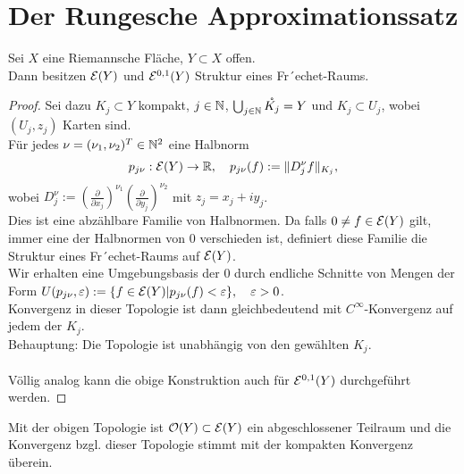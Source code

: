 
\section{Der Rungesche Approximationssatz}
\label{sec:Runge}


\begin{prop}
  Sei $X$ eine Riemannsche Fläche, $Y \subset X$ offen. \\
  Dann besitzen $\mathcal{E}(Y)$ und $\mathcal{E}^{0,1}(Y)$ Struktur eines Fr´echet-Raums.
\end{prop}

\begin{proof}
  Sei dazu $K_j \subset Y$ kompakt, $j \in \mathbb{N}$, $\bigcup_{j \in \mathbb{N}}
  \mathring{K_j} = Y$ und $K_j \subset U_j$, wobei $(U_j, z_j)$ Karten
  sind. \\
  Für jedes $\nu = (\nu_1, \nu_2)^T \in \mathbb{N}^2$ eine Halbnorm
  \[
  p_{j\nu}: \mathcal{E}(Y) \rightarrow \mathbb{R}, \quad p_{j\nu}(f) := \|D_j^\nu f\|_{K_j},
  \]
  wobei $D^\nu_j := \left ( \frac{\partial}{\partial x_j} \right
  )^{\nu_1} \left ( \frac{\partial}{\partial y_j} \right )^{\nu_2}$
  mit $z_j = x_j + iy_j$. \\
  Dies ist eine abzählbare Familie von Halbnormen. Da falls $0 \neq f
  \in \mathcal{E}(Y)$ gilt, immer eine der Halbnormen von 0 verschieden ist,
  definiert diese Familie die Struktur eines Fr´echet-Raums auf
  $\mathcal{E}(Y)$. \\
  Wir erhalten eine Umgebungsbasis der 0 durch endliche Schnitte von
  Mengen der Form $U(p_{j\nu}, \varepsilon) := \{f \in \mathcal{E}(Y) |
  p_{j\nu}(f) < \varepsilon \}, \quad \varepsilon > 0$. \\
  Konvergenz in dieser Topologie ist dann gleichbedeutend mit
  $C^\infty$-Konvergenz auf jedem der $K_j$. \\
  Behauptung: Die Topologie ist unabhängig von den gewählten $K_j$.\\
  \\
  Völlig analog kann die obige Konstruktion auch für $\mathcal{E}^{0,1}(Y)$
  durchgeführt werden.
\end{proof}


\begin{cor}
  Mit der obigen Topologie ist $\mathcal{O}(Y) \subset \mathcal{E}(Y)$ ein
  abgeschlossener Teilraum und die Konvergenz bzgl. dieser Topologie
  stimmt mit der kompakten Konvergenz überein.
\end{cor}


